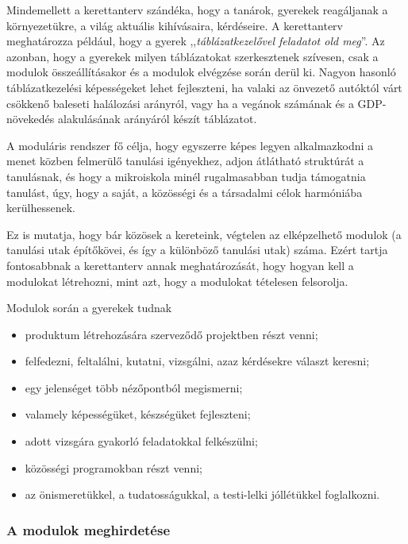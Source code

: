 Mindemellett a kerettanterv szándéka, hogy a tanárok, gyerekek
reagáljanak a környezetükre, a világ aktuális kihívásaira, kérdéseire. A
kerettanterv meghatározza például, hogy a gyerek ,,\emph{táblázatkezelővel
      feladatot old meg}''. Az azonban, hogy a gyerekek milyen táblázatokat
szerkesztenek szívesen, csak a
modulok összeállításakor és a modulok elvégzése során derül ki.
Nagyon hasonló táblázatkezelési képességeket lehet
fejleszteni, ha valaki az önvezető autóktól várt csökkenő baleseti halálozási
arányról, vagy ha a vegánok számának és a GDP-növekedés alakulásának
arányáról készít táblázatot.

A moduláris rendszer fő célja,
hogy egyszerre képes legyen alkalmazkodni a menet közben felmerülő
tanulási igényekhez,
adjon átlátható struktúrát a tanulásnak,
és hogy a mikroiskola minél rugalmasabban tudja támogatni\break a tanulást,
úgy, hogy a saját, a közösségi és a társadalmi célok harmóniába
kerülhessenek.

Ez is mutatja, hogy bár közösek a kereteink, végtelen az elképzelhető
modulok (a tanulási utak építőkövei, és így a különböző tanulási utak)
száma. Ezért tartja fontosabbnak a kerettanterv annak meghatározását,
hogy
hogyan kell a modulokat létrehozni, mint azt, hogy a modulokat tételesen
felsorolja.

Modulok során a gyerekek tudnak

\begin{itemize}
      \item produktum létrehozására szerveződő projektben részt venni;

      \item felfedezni, feltalálni, kutatni, vizsgálni, azaz kérdésekre választ
            keresni;

      \item egy jelenséget több nézőpontból megismerni;

      \item valamely képességüket, készségüket fejleszteni;

      \item adott vizsgára gyakorló feladatokkal felkészülni;

      \item közösségi programokban részt venni;

      \item az önismeretükkel, a tudatosságukkal, a testi-lelki jóllétükkel
            foglalkozni.
\end{itemize}

\subsubsection{A modulok meghirdetése}

